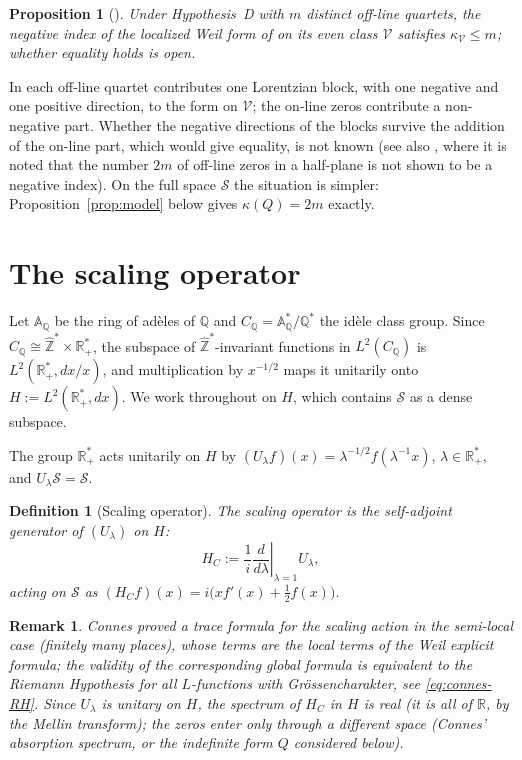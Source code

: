 \documentclass[11pt]{amsart}
\newtheorem{proposition}[theorem]{Proposition}
\newtheorem{definition}[theorem]{Definition}
\newtheorem{remark}[theorem]{Remark}
\newcommand{\kap}{\kappa}
\newcommand{\AQ}{\mathbb{A}_{\mathbb{Q}}}
\newcommand{\CQ}{C_{\mathbb{Q}}}
\newcommand{\Scal}{\mathcal{S}}
\newcommand{\Rp}{\mathbb{R}^*_+}
\begin{document}
\begin{proposition}[{\cite[Thm.~3.1, Prop.~7.2]{Index}}]\label{thm:kappa-2m}
Under Hypothesis~D with $m$ distinct off-line quartets, the negative index of the localized
Weil form of \cite{Index} on its even class $\mathcal V$ satisfies $\kap_{\mathcal V}\le m$;
whether equality holds is open.
\end{proposition}

In \cite{Index} each off-line quartet contributes one Lorentzian block, with one negative and
one positive direction, to the form on $\mathcal V$; the on-line zeros contribute a
non-negative part. Whether the negative directions of the blocks survive the addition of the
on-line part, which would give equality, is not known (see also \cite[Rem.~2.4]{Defect}, where it is noted that the number $2m$ of off-line zeros
in a half-plane is not shown to be a negative index). On the full space $\Scal$ the situation
is simpler: Proposition~\ref{prop:model} below gives $\kap(Q)=2m$ exactly.

\section{The scaling operator}
\label{sec:connes}

Let $\AQ$ be the ring of ad\`eles of $\mathbb{Q}$ and $\CQ = \AQ^*/\mathbb{Q}^*$ the
id\`ele class group.  Since $\CQ \cong \hat{\mathbb Z}^*\times\Rp$, the subspace of
$\hat{\mathbb Z}^*$-invariant functions in $L^2(\CQ)$ is $L^2(\Rp,dx/x)$, and multiplication
by $x^{-1/2}$ maps it unitarily onto $H := L^2(\Rp, dx)$.  We work throughout on $H$, which
contains $\Scal$ as a dense subspace.

The group $\Rp$ acts unitarily on $H$ by
$(U_\lambda f)(x) = \lambda^{-1/2}f(\lambda^{-1}x)$, $\lambda \in \Rp$, and $U_\lambda\Scal=\Scal$.

\begin{definition}[Scaling operator]\label{def:hc}
The \emph{scaling operator} is the self-adjoint generator of $(U_\lambda)$ on $H$:
\[
  H_C := \frac{1}{i}\left.\frac{d}{d\lambda}\right|_{\lambda=1} U_\lambda,
\]
acting on $\Scal$ as $(H_C f)(x) = i\bigl(xf'(x)+\tfrac12 f(x)\bigr)$.
\end{definition}

\begin{remark}\label{rem:connes-spectrum}
Connes \cite{Connes99} proved a trace formula for the scaling action in the semi-local case
(finitely many places), whose terms are the local terms of the Weil explicit formula; the
validity of the corresponding global formula is equivalent to the Riemann Hypothesis for all
$L$-functions with Gr\"ossencharakter, see \eqref{eq:connes-RH}.  Since $U_\lambda$ is
unitary on $H$, the spectrum of $H_C$ in $H$ is real (it is all of $\mathbb{R}$, by the Mellin
transform); the zeros enter only through a different
space (Connes' absorption spectrum, or the indefinite form $Q$ considered below).
\end{remark}
\end{document}
